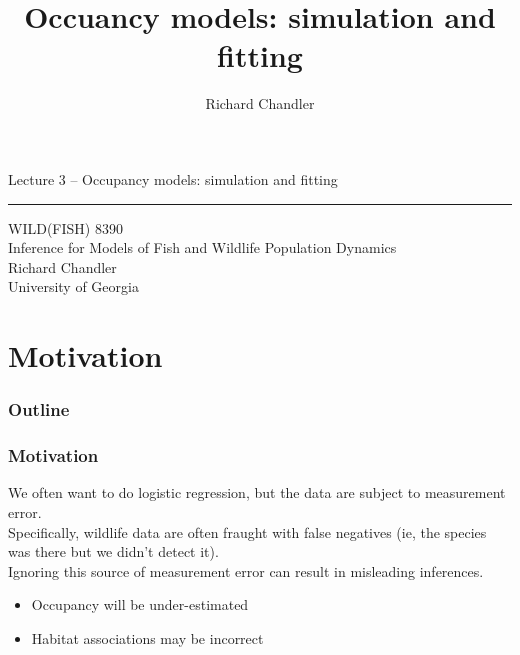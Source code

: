 \documentclass[color=usenames,dvipsnames,handout]{beamer}\usepackage[]{graphicx}\usepackage[]{xcolor}
\title{Occuancy models: simulation and fitting }
\author{Richard Chandler}
\begin{document}
\begin{frame}[plain]
  \LARGE
  \centering
  {\huge Lecture 3 -- Occupancy models: simulation and fitting} \\
  {\color{default} \rule{\textwidth}{0.1pt}}
  \vfill
  \large
  WILD(FISH) 8390 \\
  Inference for Models of Fish and Wildlife Population Dynamics \\
  \vfill
  \large
  Richard Chandler \\
  University of Georgia \\
\end{frame}






\section{Motivation}



\begin{frame}[plain]
  \frametitle{Outline}
  \Large
\end{frame}



\begin{frame}
  \frametitle{Motivation}
  We often want to do logistic regression, but the data are subject
  to measurement error. \\  
  \pause
  \vfill
  Specifically, wildlife data are often fraught with false negatives
  (ie, the species was there but we didn't detect it). \\
  \pause
  \vfill
  Ignoring this source of measurement error can result in misleading
  inferences. \\
  \begin{itemize}
    \item Occupancy will be under-estimated
    \item Habitat associations may be incorrect
  \end{itemize}
\end{frame}


\end{document}
